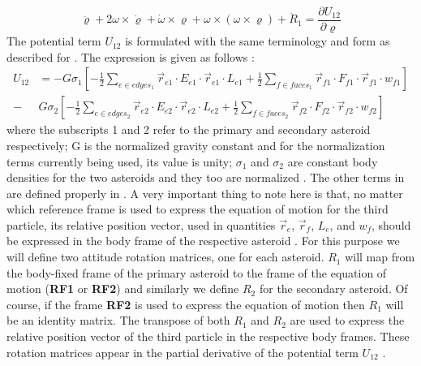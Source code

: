 \begin{equation}
\label{eom3}
\ddot{\varrho} + 2\omega \times \dot{\varrho} + \dot{\omega} \times \varrho + \omega \times (\omega \times \varrho) + \ddot{R}_1 = \frac{\partial U_{12}}{\partial \varrho}
\end{equation}
%
The potential term $U_{12}$ is formulated with the same terminology and form as described for . The expression is given as follows \cite{fahn_phd}:
\begin{equation}
\begin{aligned}
\label{U12}
U_{12} &= -G \sigma_1 \left[ -\frac{1}{2} \sum_{e\in edges_1} \overrightarrow{r}_{e1} \cdot E_{e1} \cdot \overrightarrow{r}_{e1} \cdot L_{e1} + \frac{1}{2} \sum_{f\in faces_1} \overrightarrow{r}_{f1} \cdot F_{f1} \cdot \overrightarrow{r}_{f1} \cdot w_{f1} \right] \\
 - & G \sigma_2 \left[ -\frac{1}{2} \sum_{e\in edges_2} \overrightarrow{r}_{e2} \cdot E_{e2} \cdot \overrightarrow{r}_{e2} \cdot L_{e2} + \frac{1}{2} \sum_{f\in faces_2} \overrightarrow{r}_{f2} \cdot F_{f2} \cdot \overrightarrow{r}_{f2} \cdot w_{f2} \right]
\end{aligned}
\end{equation}
%
where the subscripts 1 and 2 refer to the primary and secondary asteroid respectively; G is the normalized gravity constant and for the normalization terms currently being used, its value is unity; $\sigma_1$ and $\sigma_2$ are constant body densities for the two asteroids and they too are normalized \cite{fahn_phd}. The other terms in  are defined properly in . A very important thing to note here is that, no matter which reference frame is used to express the equation of motion for the third particle, its relative position vector, used in quantities $\overrightarrow{r}_e$, $\overrightarrow{r}_f$, $L_e$, and $w_f$, should be expressed in the body frame of the respective asteroid \cite{fahn_phd}. For this purpose we will define two attitude rotation matrices, one for each asteroid. $R_1$ will map from the body-fixed frame of the primary asteroid to the frame of the equation of motion (\textbf{RF1} or \textbf{RF2}) and similarly we define $R_2$ for the secondary asteroid. Of course, if the frame \textbf{RF2} is used to express the equation of motion then $R_1$ will be an identity matrix. The transpose of both $R_1$ and $R_2$ are used to express the relative position vector of the third particle in the respective body frames. These rotation matrices appear in the partial derivative of the potential term $U_{12}$ \cite{fahn_phd}.

